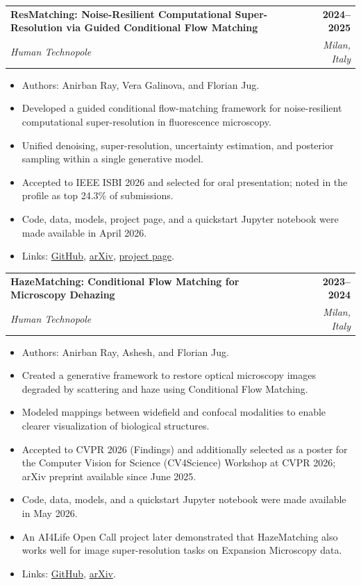 \documentclass[11pt,a4paper]{article}
\makeatletter
\newcommand{\entry}[4]{%
  \begin{tabularx}{\linewidth}{@{}>{\raggedright\arraybackslash}X r@{}}
    \textbf{#1} & \textbf{#2} \\
    \textit{#3} & \textit{#4}
  \end{tabularx}\vspace{-2pt}
}
\makeatother
\begin{document}
\entry{ResMatching: Noise-Resilient Computational Super-Resolution via Guided Conditional Flow Matching}{2024--2025}{Human Technopole}{Milan, Italy}
\begin{itemize}
  \item Authors: Anirban Ray, Vera Galinova, and Florian Jug.
  \item Developed a guided conditional flow-matching framework for noise-resilient computational super-resolution in fluorescence microscopy.
  \item Unified denoising, super-resolution, uncertainty estimation, and posterior sampling within a single generative model.
  \item Accepted to IEEE ISBI 2026 and selected for oral presentation; noted in the profile as top 24.3\% of submissions.
  \item Code, data, models, project page, and a quickstart Jupyter notebook were made available in April 2026.
  \item Links: \href{https://github.com/juglab/resmatching}{GitHub}, \href{https://arxiv.org/abs/2510.26601}{arXiv}, \href{https://rayanirban.github.io/resmatching/}{project page}.
\end{itemize}

\entry{HazeMatching: Conditional Flow Matching for Microscopy Dehazing}{2023--2024}{Human Technopole}{Milan, Italy}
\begin{itemize}
  \item Authors: Anirban Ray, Ashesh, and Florian Jug.
  \item Created a generative framework to restore optical microscopy images degraded by scattering and haze using Conditional Flow Matching.
  \item Modeled mappings between widefield and confocal modalities to enable clearer visualization of biological structures.
  \item Accepted to CVPR 2026 (Findings) and additionally selected as a poster for the Computer Vision for Science (CV4Science) Workshop at CVPR 2026; arXiv preprint available since June 2025.
  \item Code, data, models, and a quickstart Jupyter notebook were made available in May 2026.
  \item An AI4Life Open Call project later demonstrated that HazeMatching also works well for image super-resolution tasks on Expansion Microscopy data.
  \item Links: \href{https://github.com/juglab/HazeMatching}{GitHub}, \href{https://arxiv.org/abs/2506.22397}{arXiv}.
\end{itemize}
\end{document}
